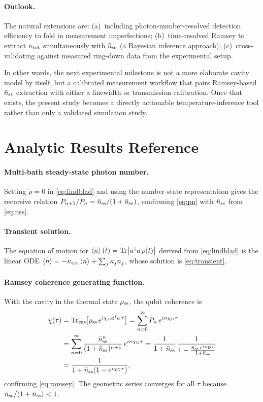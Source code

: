 \documentclass[11pt,a4paper]{article}
\newcommand{\nbar}{\bar{n}}
\newcommand{\kappat}{\kappa_{\rm tot}}
\newcommand{\nss}{\nbar_{\rm ss}}
\newcommand{\chiD}{\chi_{\rm D}}
\begin{document}
\paragraph{Outlook.}
The natural extensions are:
(a)~including photon-number-resolved detection efficiency to fold in
measurement imperfections;
(b)~time-resolved Ramsey to extract $\kappat$ simultaneously with $\nss$
(a Bayesian inference approach);
(c)~cross-validating against measured ring-down data from the experimental setup.

In other words, the next experimental milestone is not a more elaborate cavity model by itself, but a calibrated measurement workflow that pairs Ramsey-based $\nss$ extraction with either a linewidth or transmission calibration. Once that exists, the present study becomes a directly actionable temperature-inference tool rather than only a validated simulation study.

\appendix
\section{Analytic Results Reference}
\label{app:analytic}

\paragraph{Multi-bath steady-state photon number.}
Setting $\dot\rho = 0$ in \cref{eq:lindblad} and using the number-state
representation gives the recursive relation
$P_{n+1}/P_n = \nss/(1+\nss)$, confirming \cref{eq:pn} with $\nss$ from
\cref{eq:nss}.

\paragraph{Transient solution.}
The equation of motion for $\expval{n}(t) = \Tr[a^\dagger a\,\rho(t)]$ derived
from \cref{eq:lindblad} is the linear ODE
$\dot{\expval{n}} = -\kappat\expval{n} + \sum_j \kappa_j n_j$,
whose solution is \cref{eq:transient}.

\paragraph{Ramsey coherence generating function.}
With the cavity in the thermal state $\rho_{\rm ss}$, the qubit coherence is
\begin{align}
  \chi(\tau) &= \Tr_{\rm cav}\!\bigl[\rho_{\rm ss}\, e^{i\chiD a^\dagger a\,\tau}\bigr]
  = \sum_{n=0}^\infty P_n\, e^{in\chiD\tau} \notag\\
  &= \sum_{n=0}^\infty
     \frac{\nss^n}{(1+\nss)^{n+1}}\, e^{in\chiD\tau}
  = \frac{1}{1+\nss}\,\frac{1}{1 - \frac{\nss\,e^{i\chiD\tau}}{1+\nss}} \notag\\
  &= \frac{1}{1+\nss(1 - e^{i\chiD\tau})},
\end{align}
confirming \cref{eq:ramsey}.  The geometric series converges for all $\tau$
because $\nss/(1+\nss) < 1$.
\end{document}
